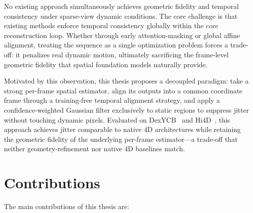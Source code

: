 No existing approach simultaneously achieves geometric fidelity and temporal consistency
under sparse-view dynamic conditions. The core challenge is that existing methods enforce temporal consistency globally within the core reconstruction loop. Whether through early attention-masking or global affine alignment, treating the sequence as a single optimization problem forces a trade-off: it penalizes real dynamic motion, ultimately sacrificing the frame-level geometric fidelity that spatial foundation models naturally provide.

Motivated by this observation, this thesis proposes a decoupled paradigm: take a strong
per-frame spatial estimator, align its outputs into a common coordinate frame through a
training-free temporal alignment strategy, and apply a confidence-weighted Gaussian filter
exclusively to static regions to suppress jitter without touching dynamic pixels. Evaluated
on DexYCB~\cite{dexycb} and Hi4D~\cite{hi4d}, this approach achieves jitter comparable to
native 4D architectures while retaining the geometric fidelity of the underlying per-frame
estimator---a trade-off that neither geometry-refinement nor native 4D baselines match.

\section{Contributions}\label{s:contributions}

The main contributions of this thesis are:

